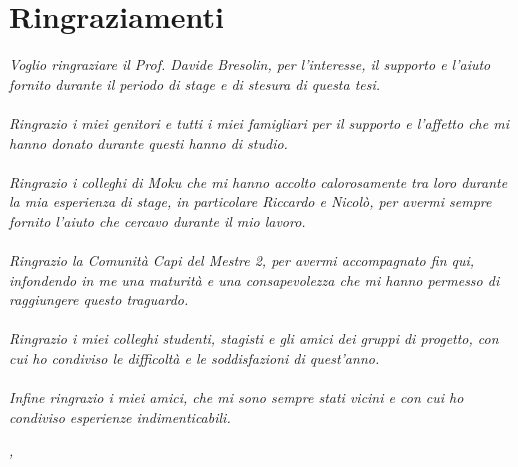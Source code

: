 \cleardoublepage
{}

\begingroup
\let\clearpage\relax
\let\cleardoublepage\relax
\let\cleardoublepage\relax

\chapter*{Ringraziamenti}
\textit{Voglio ringraziare il Prof. Davide Bresolin, per l'interesse, il supporto e l'aiuto fornito durante il periodo di stage e di stesura di questa tesi.} \\
\\
\textit{Ringrazio i miei genitori e tutti i miei famigliari per il supporto e l'affetto che mi hanno donato durante questi hanno di studio.} \\
\\
\textit{Ringrazio i colleghi di Moku che mi hanno accolto calorosamente tra loro durante la mia esperienza di stage, in particolare Riccardo e Nicolò, per avermi sempre fornito l'aiuto che cercavo durante il mio lavoro.} \\
\\
\textit{Ringrazio la Comunità Capi del Mestre 2, per avermi accompagnato fin qui, infondendo in me una maturità e una consapevolezza che mi hanno permesso di raggiungere questo traguardo.} \\
\\
\textit{Ringrazio i miei colleghi studenti, stagisti e gli amici dei gruppi di progetto, con cui ho condiviso le difficoltà e le soddisfazioni di quest'anno.} \\
\\
\textit{Infine ringrazio i miei amici, che mi sono sempre stati vicini e con cui ho condiviso esperienze indimenticabili.} \\
\bigskip

\noindent\textit{\myLocation, \myTime}
\hfill \myName

\endgroup
